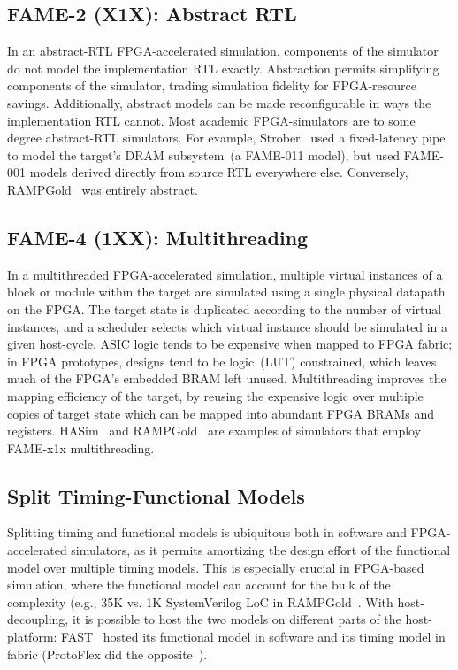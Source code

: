 \subsection{FAME-2 (X1X): Abstract RTL}

In an abstract-RTL FPGA-accelerated simulation, components of the simulator do
not model the implementation RTL exactly. Abstraction permits simplifying
components of the simulator, trading simulation fidelity for FPGA-resource
savings. Additionally, abstract models can be made reconfigurable in ways the
implementation RTL cannot. Most academic FPGA-simulators are to some degree
abstract-RTL simulators.  For example, Strober~\cite{strober} used a
fixed-latency pipe to model the target's DRAM subsystem~(a FAME-011 model),
but used FAME-001 models derived directly from source RTL everywhere else.
Conversely, RAMPGold~\cite{rampgold} was entirely abstract.

\subsection{FAME-4 (1XX): Multithreading}

In a multithreaded FPGA-accelerated simulation, multiple virtual instances of a
block or module within the target are simulated using a single physical
datapath on the FPGA. The target state is duplicated according to the number of
virtual instances, and a scheduler selects which virtual instance should be
simulated in a given host-cycle. ASIC logic tends to be expensive when mapped
to FPGA fabric; in FPGA prototypes, designs tend to be logic~(LUT) constrained,
which leaves much of the FPGA's embedded BRAM left unused.  Multithreading
improves the mapping efficiency of the target, by reusing the expensive logic
over multiple copies of target state which can be mapped into abundant FPGA BRAMs and registers.
HASim~\cite{hasim} and RAMPGold~\cite{rampgold} are examples of simulators that
employ FAME-x1x multithreading.


\subsection{Split Timing-Functional Models}

Splitting timing and functional models is ubiquitous both in software and
FPGA-accelerated simulators, as it permits amortizing the design effort of the
functional model over multiple timing models. This is especially crucial in
FPGA-based simulation, where the functional model can account for the bulk of
the complexity (e.g., 35K vs. 1K SystemVerilog LoC in RAMPGold~\cite{rampgold}. With
host-decoupling, it is possible to host the two models on different parts of
the host-platform: FAST~\cite{fast} hosted its functional model in software and its
timing model in fabric (ProtoFlex did the opposite~\cite{protoflex}).

